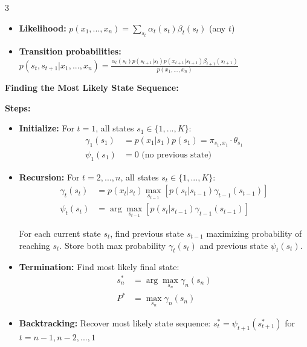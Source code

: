 \documentclass[10pt,landscape]{article}
\begin{document}
\begin{multicols}{3}
\begin{tcolorbox}[breakable, title=Hidden Markov Models, colback=hmm, boxsep=1pt, left=1pt, right=1pt, top=1pt, bottom=1pt]
\begin{itemize}[leftmargin=*,noitemsep,topsep=0pt]
    \item \textbf{Likelihood:} $p(x_1,...,x_n) = \sum_{s_t} \alpha_t(s_t)\beta_t(s_t)$ (any $t$)
    
    \item \textbf{Transition probabilities:} 
    $p(s_t, s_{t+1}|x_1,...,x_n) = \frac{\alpha_t(s_t)p(s_{t+1}|s_t)p(x_{t+1}|s_{t+1})\beta_{t+1}(s_{t+1})}{p(x_1,...,x_n)}$
\end{itemize}
\end{tcolorbox}

\begin{tcolorbox}[breakable, title=Viterbi Algorithm, colback=hmm, boxsep=1pt, left=1pt, right=1pt, top=1pt, bottom=1pt]
\textbf{Finding the Most Likely State Sequence:}

\textbf{Steps:}
\begin{itemize}[leftmargin=*,noitemsep,topsep=0pt]
    \item \textbf{Initialize:} For $t=1$, all states $s_1 \in \{1,...,K\}$:
    \begin{align}
    \gamma_1(s_1) &= p(x_1|s_1)p(s_1) = \pi_{s_1,x_1} \cdot \theta_{s_1}\\
    \psi_1(s_1) &= 0 \text{ (no previous state)}
    \end{align}
    
    \item \textbf{Recursion:} For $t = 2,...,n$, all states $s_t \in \{1,...,K\}$:
    \begin{align}
    \gamma_t(s_t) &= p(x_t|s_t) \max_{s_{t-1}} [p(s_t|s_{t-1})\gamma_{t-1}(s_{t-1})]\\
    \psi_t(s_t) &= \arg\max_{s_{t-1}} [p(s_t|s_{t-1})\gamma_{t-1}(s_{t-1})]
    \end{align}
    
    For each current state $s_t$, find previous state $s_{t-1}$ maximizing probability of reaching $s_t$. Store both max probability $\gamma_t(s_t)$ and previous state $\psi_t(s_t)$.
    
    \item \textbf{Termination:} Find most likely final state:
    \begin{align}
    s_n^* &= \arg\max_{s_n} \gamma_n(s_n)\\
    P^* &= \max_{s_n} \gamma_n(s_n)
    \end{align}
    
    \item \textbf{Backtracking:} Recover most likely state sequence:
    $s_t^* = \psi_{t+1}(s_{t+1}^*)$ for $t = n-1, n-2, ..., 1$
\end{itemize}
\end{tcolorbox}


\end{multicols}
\end{document}
